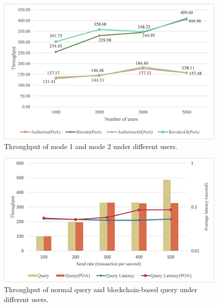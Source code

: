 \begin{figure}[htb]
    \centering
    \includegraphics[height=!,width=1\linewidth,keepaspectratio=true]{figures/authorize_comparsion.png}
    \caption{{\footnotesize Throughput of mode 1 and mode 2 under different users.}}
    \label{fig:authorize_compare}
\end{figure}

\begin{figure}[htb]
    \centering
    \includegraphics[height=!,width=1\linewidth,keepaspectratio=true]{figures/query.png}
    \caption{{\footnotesize Throughput of normal query and blockchain-based query under different users.}}
    \label{fig:query}
\end{figure}
